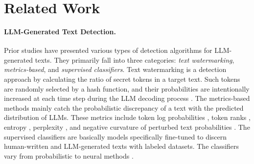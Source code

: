 \section{Related Work}
\paragraph{LLM-Generated Text Detection.} 
Prior studies have presented various types of detection algorithms for LLM-generated texts.
They primarily fall into three categories: \emph{text watermarking}, \emph{metrics-based}, and \emph{supervised classifiers}.
Text watermarking is a detection approach by calculating the ratio of secret tokens in a target text.
Such tokens are randomly selected by a hash function, and their probabilities are intentionally increased at each time step during the LLM decoding process \cite{kirchenbauer2023watermark}.
The metrics-based methods mainly catch the probabilistic discrepancy of a text with the predicted distribution of LLMs.
These metrics include token log probabilities \cite{gehrmann2019gltr}, token ranks \cite{solaiman2019release,su2023detectllmleveraginglogrank}, entropy \cite{ent08}, perplexity \cite{bere16,hans2024spotting}, and negative curvature of perturbed text probabilities \cite{mitchell2023detectgpt,bao2024fastdetectgptefficientzeroshotdetection}.
The supervised classifiers are basically models specifically fine-tuned to discern human-written and LLM-generated texts with labeled datasets. The classifiers vary from probabilistic \cite{ippolito-etal-2020-automatic,crothers2023machinegeneratedtextcomprehensive} to neural methods \cite{uchendu-etal-2020-authorship,rodriguez-etal-2022-cross,guo2023close}. 


